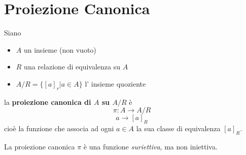 \documentclass[a4paper,12pt, oneside]{book}
\begin{document}
	\section{Proiezione Canonica}
	\begin{definizione}
		Siano \begin{itemize}
			\item $A$ un insieme (non vuoto)
			\item $R$ una relazione di equivalenza su $A$
			\item $A/R = \{ [a]_{r} | a \in A \}$ l' insieme quoziente
		\end{itemize}
		la \textbf{\textbf{proiezione canonica di $A$ su $A/R$}} è $$\pi : A \longrightarrow A/R$$ $$a \longrightarrow [a]_{R}$$ cioè la funzione che associa ad ogni $a \in A$ la sua classe di equivalenza $[a]_{R}$.
	\end{definizione}
	\begin{nota}
		La proiezione canonica $\pi$ è una funzione \textit{suriettiva}, ma non iniettiva.
	\end{nota}
	
\end{document}
